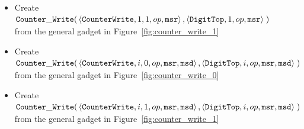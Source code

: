 \begin{itemize}
\begin{itemize}
        \item Create
        $\begin{aligned}[t]
            {\tt Counter\_Write}(& \left\langle {\tt CounterWrite}, 1, 1, op, {\tt msr} \right\rangle,
                      \left\langle {\tt DigitTop},     1,    op, {\tt msr} \right\rangle \;)
        \end{aligned}$ \\ from the general gadget in Figure~\ref{fig:counter_write_1}

        \item Create
        $\begin{aligned}[t]
            {\tt Counter\_Write}(& \left\langle {\tt CounterWrite}, i, 0, op, {\tt msr}, {\tt msd}\right\rangle,
                      \left\langle {\tt DigitTop},     i,    op, {\tt msr}, {\tt msd}\right\rangle \;)
        \end{aligned}$ \\ from the general gadget in Figure~\ref{fig:counter_write_0}

        \item Create
        $\begin{aligned}[t]
            {\tt Counter\_Write}(& \left\langle {\tt CounterWrite}, i, 1, op, {\tt msr}, {\tt msd}\right\rangle,
                      \left\langle {\tt DigitTop},     i,    op, {\tt msr}, {\tt msd}\right\rangle \;)
        \end{aligned}$ \\ from the general gadget in Figure~\ref{fig:counter_write_1}
    \end{itemize}
\end{itemize}

\vspace{.5cm}

